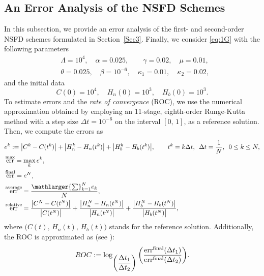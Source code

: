\documentclass[11pt]{article}
\theoremstyle{definition}
\theoremstyle{remark}
\numberwithin{equation}{section}
\DeclareMathOperator{\err}{err}
\begin{document}
\subsection{An Error Analysis of the NSFD Schemes}
In this subsection, we provide an error analysis of the first- and second-order NSFD schemes formulated in Section~\ref{Sec3}. 
Finally, we consider \eqref{eq:1G} with the following parameters
\begin{equation*}
\begin{split}
  &\Lambda = 10^4, \quad  \alpha = 0.025, \quad\quad \gamma = 0.02, \quad \mu = 0.01,\\
  &\theta = 0.025, \quad \beta = 10^{-6}, \quad \kappa_1 = 0.01, \quad \kappa_2 = 0.02,
\end{split}
\end{equation*}
and the initial data
\begin{equation*}
     C(0) = 10^4, \quad H_n(0) = 10^3, \quad H_b(0) = 10^3.
\end{equation*}
To estimate errors and the \textit{rate of convergence} (ROC), we use the numerical approximation obtained by employing an 11-stage, eighth-order Runge-Kutta method \cite{Copper} with a step size $\Delta t = 10^{-6}$ on the interval $[0,\, 1]$, as a reference solution. 
Then, we compute the errors as
\begin{equation*}
\begin{split}
&e^k := \big|C^k - C(t^k)\big| + \big|H_n^k - H_n(t^k)\big| + \big|H_b^k - H_b(t^k)\big|, 
\qquad t^k = k\Delta t,\,\,\,\Delta t=\dfrac{1}{N},\,\,\,0 \le k \le N,\\
&\err^{\rm max} = \max_{k}e^k,\\
&\err^{\rm final} = e^N, \\
&\err^{\rm average} = \dfrac{\mathlarger{\sum}_{k = 1}^Ne_k}{N},\\
&\err^{\rm relative} = \dfrac{\big|C^N - C(t^N)\big|}{\big|C(t^N)\big|} + \dfrac{\big|H_n^N - H_n(t^N)\big|}{\big|H_n(t^N)\big|} + \dfrac{\big|H_b^N - H_b(t^N)\big|}{\big|H_b(t^N)\big|},
\end{split}
\end{equation*}
where $\big(C(t),\,H_n(t),\,H_b(t)\big)$ stands for the reference solution. 
Additionally, the ROC is approximated as (see \cite{Ascher}):
\begin{equation*}
ROC := \log_{\bigg(\dfrac{\Delta t_1}{\Delta t_2}\bigg)}\bigg(\dfrac{\err^{\rm final}(\Delta t_1)}{\err^{\rm final}(\Delta t_2)}\bigg).
\end{equation*}
\end{document}
